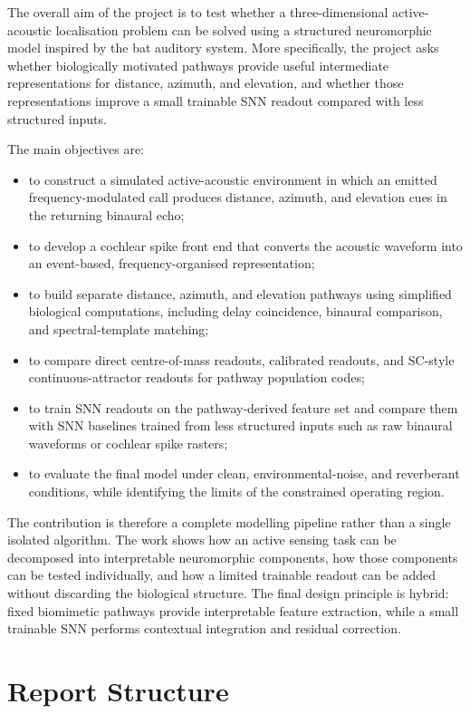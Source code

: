 The overall aim of the project is to test whether a three-dimensional active-acoustic localisation problem can be solved using a structured neuromorphic model inspired by the bat auditory system. More specifically, the project asks whether biologically motivated pathways provide useful intermediate representations for distance, azimuth, and elevation, and whether those representations improve a small trainable SNN readout compared with less structured inputs.

The main objectives are:
\begin{itemize}
    \item to construct a simulated active-acoustic environment in which an emitted frequency-modulated call produces distance, azimuth, and elevation cues in the returning binaural echo;
    \item to develop a cochlear spike front end that converts the acoustic waveform into an event-based, frequency-organised representation;
    \item to build separate distance, azimuth, and elevation pathways using simplified biological computations, including delay coincidence, binaural comparison, and spectral-template matching;
    \item to compare direct centre-of-mass readouts, calibrated readouts, and SC-style continuous-attractor readouts for pathway population codes;
    \item to train SNN readouts on the pathway-derived feature set and compare them with SNN baselines trained from less structured inputs such as raw binaural waveforms or cochlear spike rasters;
    \item to evaluate the final model under clean, environmental-noise, and reverberant conditions, while identifying the limits of the constrained operating region.
\end{itemize}

The contribution is therefore a complete modelling pipeline rather than a single isolated algorithm. The work shows how an active sensing task can be decomposed into interpretable neuromorphic components, how those components can be tested individually, and how a limited trainable readout can be added without discarding the biological structure. The final design principle is hybrid: fixed biomimetic pathways provide interpretable feature extraction, while a small trainable SNN performs contextual integration and residual correction.

\section{Report Structure}

